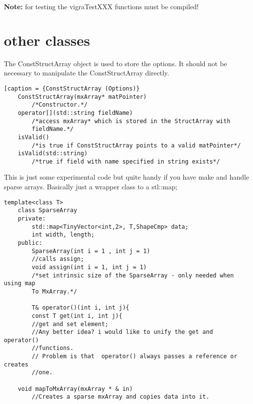 \documentclass[a4paper,10pt]{article}
\begin{document}
\textbf{Note:} for testing the vigraTestXXX functions must be compiled!

\section{other classes}
The ConstStructArray object is used to store the options.
It should not be necessary to manipulate the ConstStructArray directly.
\begin{lstlisting}[caption = {ConstStructArray (Options)}
	ConstStructArray(mxArray* matPointer)
		/*Constructor.*/
	operator[](std::string fieldName)
		/*access mxArray* which is stored in the StructArray with 
		fieldName.*/
	isValid()
		/*is true if ConstStructArray points to a valid matPointer*/
	isValid(std::string)
		/*true if field with name specified in string exists*/
\end{lstlisting}


	This is just some experimental code but quite handy if you have make 
	and handle sparse arrays. Basically just a wrapper class to a stl::map;
\begin{lstlisting}[caption = {Sparse array}]
    template<class T>
    class SparseArray
    private:
        std::map<TinyVector<int,2>, T,ShapeCmp> data;
        int width, length;
    public:
        SparseArray(int i = 1 , int j = 1)
	    //calls assign;
        void assign(int i = 1, int j = 1)
	    /*set intrinsic size of the SparseArray - only needed when using map
	    To MxArray.*/

    	T& operator()(int i, int j){
    	const T get(int i, int j){
	    //get and set element;
	    //Any better idea? i would like to unify the get and operator() 
	    //functions.
	    // Problem is that  operator() always passes a reference or creates 
	    //one.

	void mapToMxArray(mxArray * & in)
	    //Creates a sparse mxArray and copies data into it.
\end{lstlisting}
\end{document}
